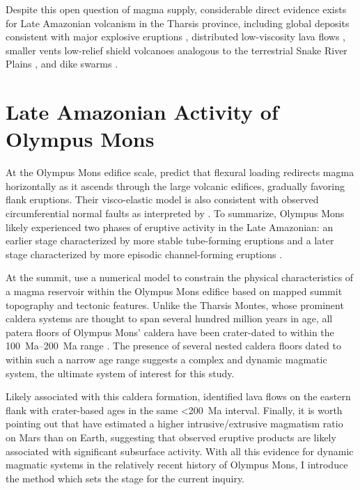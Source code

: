 Despite this open question of magma supply, considerable direct evidence exists for Late Amazonian volcanism in the Tharsis province, including global deposits consistent with major explosive eruptions \parencite{hynek_explosive_2003}, distributed low-viscosity lava flows \parencite{hauber_very_2011}, smaller vents \parencite{wilson_fissure_2009,richardson_small_2021} low-relief shield volcanoes analogous to the terrestrial Snake River Plains \parencite{hauber_topography_2009}, and dike swarms \parencite{pieterek_late_2022}.

\section{Late Amazonian Activity of Olympus Mons}

At the Olympus Mons edifice scale, \textcite{mcgovern_state_1993} predict that flexural loading redirects magma horizontally as it ascends through the large volcanic edifices, gradually favoring flank eruptions. Their visco-elastic model is also consistent with observed circumferential normal faults as interpreted by \textcite{thomas_flank_1990}. To summarize, Olympus Mons likely experienced two phases of eruptive activity in the Late Amazonian: an earlier stage characterized by more stable tube-forming eruptions and a later stage characterized by more episodic channel-forming eruptions \parencite{bleacher_olympus_2007,peters_flank_2017}.

At the summit, \textcite{zuber_caldera_1992} use a numerical model to constrain the physical characteristics of a magma reservoir within the Olympus Mons edifice based on mapped summit topography and tectonic features. Unlike the Tharsis Montes, whose prominent caldera systems are thought to span several hundred million years in age, all patera floors of Olympus Mons' caldera have been crater-dated to within the \qtyrange{100}{200}{Ma} range \parencite{neukum_recent_2004}. The presence of several nested caldera floors dated to within such a narrow age range suggests a complex and dynamic magmatic system, the ultimate system of interest for this study.

Likely associated with this caldera formation, \textcite{basilevsky_geologically_2006} identified lava flows on the eastern flank with crater-based ages in the same \qty{<200}{Ma} interval. Finally, it is worth pointing out that \textcite[][and others]{black_eruptibility_2016} have estimated a higher intrusive/extrusive magmatism ratio on Mars than on Earth, suggesting that observed eruptive products are likely associated with significant subsurface activity. With all this evidence for dynamic magmatic systems in the relatively recent history of Olympus Mons, I introduce the method which sets the stage for the current inquiry.  

